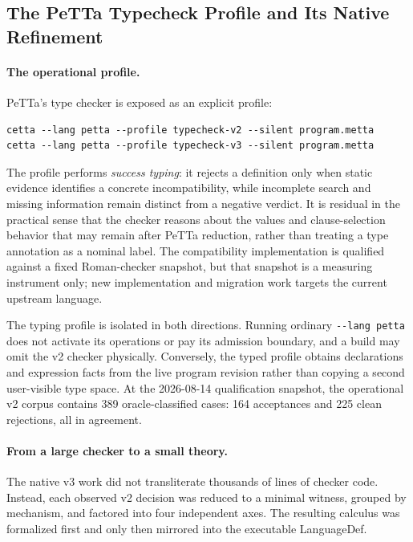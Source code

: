 \documentclass[11pt]{article}
\newcommand{\code}[1]{\texttt{#1}}
\newcommand{\PeTTa}{\textup{PeTTa}}
\begin{document}
\subsection{The \PeTTa{} Typecheck Profile and Its Native Refinement}
\label{sec:petta-typecheck}

\paragraph{The operational profile.}
\PeTTa{}'s type checker is exposed as an explicit profile:

\begin{lstlisting}
cetta --lang petta --profile typecheck-v2 --silent program.metta
cetta --lang petta --profile typecheck-v3 --silent program.metta
\end{lstlisting}

The profile performs \emph{success typing}: it rejects a definition only
when static evidence identifies a concrete incompatibility, while incomplete
search and missing information remain distinct from a negative verdict.  It
is residual in the practical sense that the checker reasons about the values
and clause-selection behavior that may remain after \PeTTa{} reduction,
rather than treating a type annotation as a nominal label.  The compatibility
implementation is qualified against a fixed Roman-checker snapshot, but that
snapshot is a measuring instrument only; new implementation and migration
work targets the current upstream language.

The typing profile is isolated in both directions.  Running ordinary
\code{-{}-lang petta} does not activate its operations or pay its admission
boundary, and a build may omit the v2 checker physically.  Conversely, the
typed profile obtains declarations and expression facts from the live program
revision rather than copying a second user-visible type space.  At the
2026-08-14 qualification snapshot, the operational v2 corpus contains 389
oracle-classified cases: 164 acceptances and 225 clean rejections, all in
agreement.

\paragraph{From a large checker to a small theory.}
The native v3 work did not transliterate thousands of lines of checker code.
Instead, each observed v2 decision was reduced to a minimal witness, grouped
by mechanism, and factored into four independent axes.  The resulting
calculus was formalized first and only then mirrored into the executable
LanguageDef.
\end{document}
